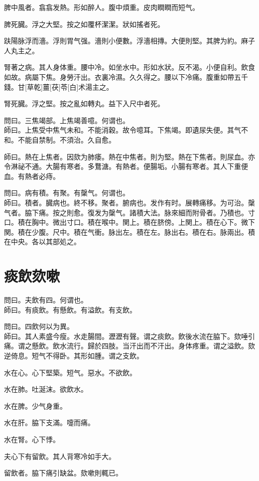 \documentclass[12pt,oneside,UTF8,b5paper]{ctexbook}她她她她她她她
\begin{document}
脾中風者。翕翕发熱。形如醉人。腹中煩重。皮肉瞤瞤而短气。

脾死臓。浮之大堅。按之如覆杯潔潔。狀如搖者死。

趺陽脉浮而濇。浮則胃气强。濇則小便數。浮濇相摶。大便則堅。其脾为約。麻子人丸主之。

腎著之病。其人身体重。腰中冷。如坐水中。形如水狀。反不渴。小便自利。飲食如故。病屬下焦。身勞汗出。衣裏冷濕。久久得之。腰以下冷痛。腹重如帶五千錢。甘[草乾]薑[茯]苓[白]术湯主之。

腎死臓。浮之堅。按之亂如轉丸。益下入尺中者死。

問曰。三焦竭部。上焦竭善噫。何谓也。\\
師曰。上焦受中焦气未和。不能消穀。故令噫耳。下焦竭。即遺尿失便。其气不和。不能自禁制。不須治。久自愈。

師曰。熱在上焦者。因欬为肺痿。熱在中焦者。則为堅。熱在下焦者。則尿血。亦令淋祕不通。大腸有寒者。多鶩溏。有熱者。便腸垢。小腸有寒者。其人下重便血。有熱者必痔。

問曰。病有積。有聚。有䅽气。何谓也。\\
師曰。積者。臓病也。終不移。聚者。腑病也。发作有时。展轉痛移。为可治。䅽气者。脇下痛。按之則愈。復发为䅽气。諸積大法。脉來細而附骨者。乃積也。寸口。積在胸中。微出寸口。積在喉中。関上。積在脐傍。上関上。積在心下。微下関。積在少腹。尺中。積在气衝。脉出左。積在左。脉出右。積在右。脉兩出。積在中央。各以其部処之。

\chapter{痰飲欬嗽}

問曰。夫飲有四。何谓也。\\
師曰。有痰飲。有懸飲。有溢飲。有支飲。

問曰。四飲何以为異。\\
師曰。其人素盛今瘦。水走腸間。瀝瀝有聲。谓之痰飲。飲後水流在脇下。欬唾引痛。谓之懸飲。飲水流行。歸於四肢。当汗出而不汗出。身体疼重。谓之溢飲。欬逆倚息。短气不得卧。其形如腫。谓之支飲。

水在心。心下堅築。短气。惡水。不欲飲。

水在肺。吐涎沫。欲飲水。

水在脾。少气身重。

水在肝。脇下支滿。嚏而痛。

水在腎。心下悸。

夫心下有留飲。其人背寒冷如手大。

留飲者。脇下痛引缺盆。欬嗽則輒已。
\end{document}
